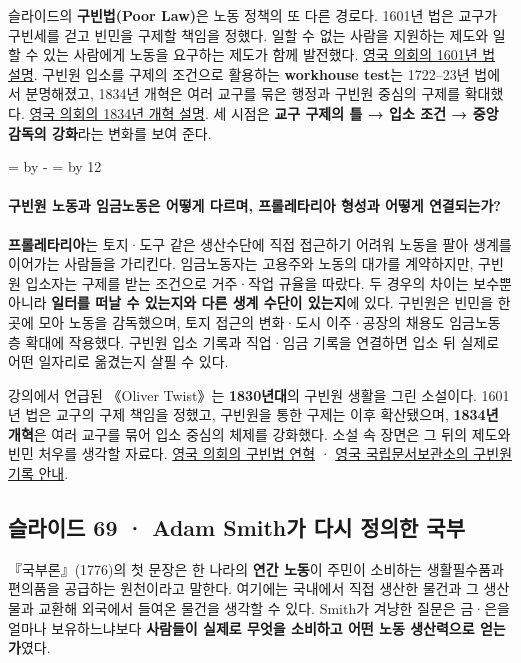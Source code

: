 \documentclass[10pt,a4paper]{article}
\newcommand{\ReserveQuestionSpace}{%
  \par\begingroup
  \dimen0=\pagegoal \advance\dimen0 by -\pagetotal
  \dimen2=\baselineskip \multiply\dimen2 by 12
  \ifdim\dimen0<\dimen2 \newpage\fi
  \endgroup}
\begin{document}
슬라이드의 \textbf{구빈법(Poor Law)}은 노동 정책의 또 다른 경로다. 1601년 법은 교구가 구빈세를 걷고 빈민을 구제할 책임을 정했다. 일할 수 없는 사람을 지원하는 제도와 일할 수 있는 사람에게 노동을 요구하는 제도가 함께 발전했다. \href{https://www.parliament.uk/about/living-heritage/evolutionofparliament/2015-parliament-in-the-making/get-involved1/2015-banners-exhibition/rachel-gadsden/1601-poor-law-gallery/}{영국 의회의 1601년 법 설명}. 구빈원 입소를 구제의 조건으로 활용하는 \textbf{workhouse test}는 1722–23년 법에서 분명해졌고, 1834년 개혁은 여러 교구를 묶은 행정과 구빈원 중심의 구제를 확대했다. \href{https://www.parliament.uk/about/living-heritage/transformingsociety/livinglearning/19thcentury/overview/poorlaw/}{영국 의회의 1834년 개혁 설명}. 세 시점은 \textbf{교구 구제의 틀 → 입소 조건 → 중앙 감독의 강화}라는 변화를 보여 준다.\par

\ReserveQuestionSpace
\paragraph{구빈원 노동과 임금노동은 어떻게 다르며, 프롤레타리아 형성과 어떻게 연결되는가?}
\textbf{프롤레타리아}는 토지·도구 같은 생산수단에 직접 접근하기 어려워 노동을 팔아 생계를 이어가는 사람들을 가리킨다. 임금노동자는 고용주와 노동의 대가를 계약하지만, 구빈원 입소자는 구제를 받는 조건으로 거주·작업 규율을 따랐다. 두 경우의 차이는 보수뿐 아니라 \textbf{일터를 떠날 수 있는지와 다른 생계 수단이 있는지}에 있다. 구빈원은 빈민을 한곳에 모아 노동을 감독했으며, 토지 접근의 변화·도시 이주·공장의 채용도 임금노동층 확대에 작용했다. 구빈원 입소 기록과 직업·임금 기록을 연결하면 입소 뒤 실제로 어떤 일자리로 옮겼는지 살필 수 있다.\par

강의에서 언급된 《Oliver Twist》는 \textbf{1830년대}의 구빈원 생활을 그린 소설이다. 1601년 법은 교구의 구제 책임을 정했고, 구빈원을 통한 구제는 이후 확산됐으며, \textbf{1834년 개혁}은 여러 교구를 묶어 입소 중심의 체제를 강화했다. 소설 속 장면은 그 뒤의 제도와 빈민 처우를 생각할 자료다. \href{https://www.parliament.uk/about/living-heritage/evolutionofparliament/2015-parliament-in-the-making/get-involved1/2015-banners-exhibition/rachel-gadsden/1601-poor-law-gallery/}{영국 의회의 구빈법 연혁} · \href{https://www.nationalarchives.gov.uk/help-with-your-research/research-guides/workhouse-inmate-or-member-of-staff/}{영국 국립문서보관소의 구빈원 기록 안내}.\par

\subsection{슬라이드 69 · Adam Smith가 다시 정의한 국부}
『국부론』(1776)의 첫 문장은 한 나라의 \textbf{연간 노동}이 주민이 소비하는 생활필수품과 편의품을 공급하는 원천이라고 말한다. 여기에는 국내에서 직접 생산한 물건과 그 생산물과 교환해 외국에서 들여온 물건을 생각할 수 있다. Smith가 겨냥한 질문은 금·은을 얼마나 보유하느냐보다 \textbf{사람들이 실제로 무엇을 소비하고 어떤 노동 생산력으로 얻는가}였다.\par
\end{document}
